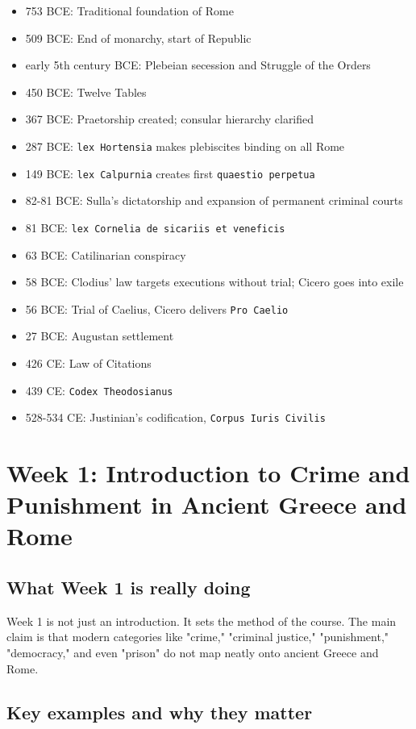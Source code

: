 \documentclass[11pt]{article}
\begin{document}
\begin{itemize}
\item 753 BCE: Traditional foundation of Rome
\item 509 BCE: End of monarchy, start of Republic
\item early 5th century BCE: Plebeian secession and Struggle of the Orders
\item 450 BCE: Twelve Tables
\item 367 BCE: Praetorship created; consular hierarchy clarified
\item 287 BCE: \texttt{lex Hortensia} makes plebiscites binding on all Rome
\item 149 BCE: \texttt{lex Calpurnia} creates first \texttt{quaestio perpetua}
\item 82-81 BCE: Sulla's dictatorship and expansion of permanent criminal courts
\item 81 BCE: \texttt{lex Cornelia de sicariis et veneficis}
\item 63 BCE: Catilinarian conspiracy
\item 58 BCE: Clodius' law targets executions without trial; Cicero goes into exile
\item 56 BCE: Trial of Caelius, Cicero delivers \texttt{Pro Caelio}
\item 27 BCE: Augustan settlement
\item 426 CE: Law of Citations
\item 439 CE: \texttt{Codex Theodosianus}
\item 528-534 CE: Justinian's codification, \texttt{Corpus Iuris Civilis}
\end{itemize}

\section{Week 1: Introduction to Crime and Punishment in Ancient Greece and Rome}

\subsection{What Week 1 is really doing}

Week 1 is not just an introduction. It sets the method of the course. The main claim is that modern categories like "crime," "criminal justice," "punishment," "democracy," and even "prison" do not map neatly onto ancient Greece and Rome.

\subsection{Key examples and why they matter}
\end{document}

